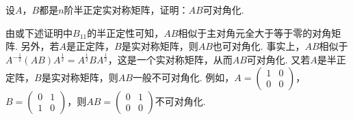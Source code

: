 \documentclass[../../main.tex]{subfiles}%
\begin{document}
\begin{proposition}\label{proposition:例9.73}
设\(A\)，\(B\)都是\(n\)阶半正定实对称矩阵，证明：\(AB\)可对角化.
\end{proposition}
\begin{remark}
由或下述证明中\(B_{11}\)的半正定性可知，\(AB\)相似于主对角元全大于等于零的对角矩阵. 另外，若\(A\)是正定阵，\(B\)是实对称矩阵，则\(AB\)也可对角化. 事实上，\(AB\)相似于\(A^{-\frac{1}{2}}(AB)A^{\frac{1}{2}}=A^{\frac{1}{2}}BA^{\frac{1}{2}}\)，这是一个实对称矩阵，从而\(AB\)可对角化. 又若\(A\)是半正定阵，\(B\)是实对称矩阵，则\(AB\)一般不可对角化. 例如，\(A=\begin{pmatrix}1&0\\0&0\end{pmatrix}\)，\(B=\begin{pmatrix}0&1\\1&0\end{pmatrix}\)，则\(AB=\begin{pmatrix}0&1\\0&0\end{pmatrix}\)不可对角化. 
\end{remark}
\end{document}
